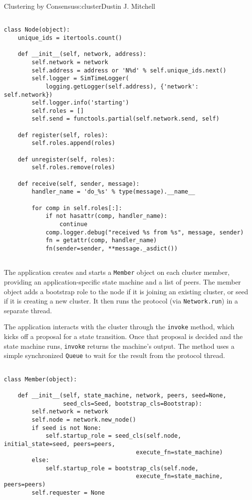 \begin{aosachapter}{Clustering by Consensus}{s:cluster}{Dustin J. Mitchell}
\begin{verbatim}

class Node(object):
    unique_ids = itertools.count()

    def __init__(self, network, address):
        self.network = network
        self.address = address or 'N%d' % self.unique_ids.next()
        self.logger = SimTimeLogger(
            logging.getLogger(self.address), {'network': self.network})
        self.logger.info('starting')
        self.roles = []
        self.send = functools.partial(self.network.send, self)

    def register(self, roles):
        self.roles.append(roles)

    def unregister(self, roles):
        self.roles.remove(roles)

    def receive(self, sender, message):
        handler_name = 'do_%s' % type(message).__name__

        for comp in self.roles[:]:
            if not hasattr(comp, handler_name):
                continue
            comp.logger.debug("received %s from %s", message, sender)
            fn = getattr(comp, handler_name)
            fn(sender=sender, **message._asdict())
    
\end{verbatim}

\label{application-interface}

The application creates and starts a \texttt{Member} object on each
cluster member, providing an application-specific state machine and a
list of peers. The member object adds a bootstrap role to the node if it
is joining an existing cluster, or seed if it is creating a new cluster.
It then runs the protocol (via \texttt{Network.run}) in a separate
thread.

The application interacts with the cluster through the \texttt{invoke}
method, which kicks off a proposal for a state transition. Once that
proposal is decided and the state machine runs, \texttt{invoke} returns
the machine's output. The method uses a simple synchronized
\texttt{Queue} to wait for the result from the protocol thread.

\begin{verbatim}

class Member(object):

    def __init__(self, state_machine, network, peers, seed=None,
                 seed_cls=Seed, bootstrap_cls=Bootstrap):
        self.network = network
        self.node = network.new_node()
        if seed is not None:
            self.startup_role = seed_cls(self.node, initial_state=seed, peers=peers,
                                      execute_fn=state_machine)
        else:
            self.startup_role = bootstrap_cls(self.node,
                                      execute_fn=state_machine, peers=peers)
        self.requester = None


\end{verbatim}
\end{aosachapter}
